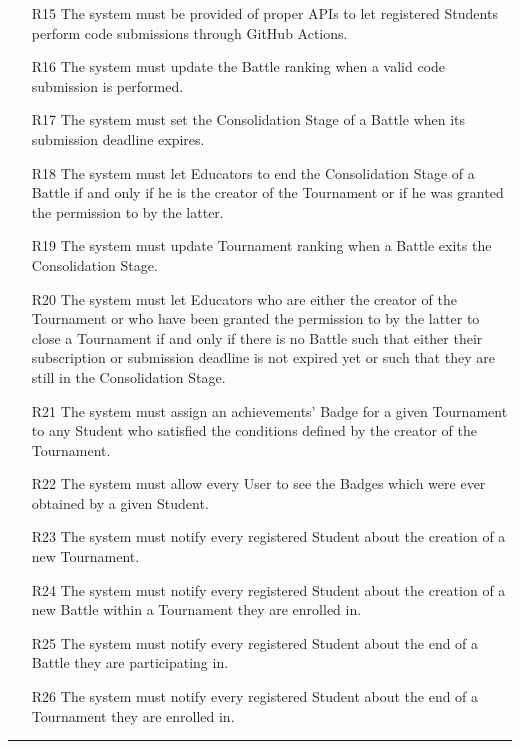 \documentclass{Configuration_Files/Template}
\begin{document}
\begin{enumerate}
    \item[\textcolor{bluepoli}{R15}] The system must be provided of proper APIs to let registered Students perform code submissions through GitHub Actions.
    \item[\textcolor{bluepoli}{R16}] The system must update the Battle ranking when a valid code submission is performed.
    \item[\textcolor{bluepoli}{R17}] The system must set the Consolidation Stage of a Battle when its submission deadline expires.
    \item[\textcolor{bluepoli}{R18}] The system must let Educators to end the Consolidation Stage of a Battle if and only if he is the creator of the Tournament or if he was granted the permission to by the latter.
    \item[\textcolor{bluepoli}{R19}] The system must update Tournament ranking when a Battle exits the Consolidation Stage.
    \item[\textcolor{bluepoli}{R20}] The system must let Educators who are either the creator of the Tournament or who have been granted the permission to by the latter to close a Tournament if and only if there is no Battle such that either their subscription or submission deadline is not expired yet or such that they are still in the Consolidation Stage.
    \item[\textcolor{bluepoli}{R21}] The system must assign an achievements’ Badge for a given Tournament to any Student who satisfied the conditions defined by the creator of the Tournament.
    \item[\textcolor{bluepoli}{R22}] The system must allow every User to see the Badges which were ever obtained by a given Student.
    \item[\textcolor{bluepoli}{R23}] The system must notify every registered Student about the creation of a new Tournament.
    \item[\textcolor{bluepoli}{R24}] The system must notify every registered Student about the creation of a new Battle within a Tournament they are enrolled in.
    \item[\textcolor{bluepoli}{R25}] The system must notify every registered Student about the end of a Battle they are participating in.
    \item[\textcolor{bluepoli}{R26}] The system must notify every registered Student about the end of a Tournament they are enrolled in.
\end{enumerate}

{\color{bluepoli}\rule{\linewidth}{0.1pt}}
\end{document}
